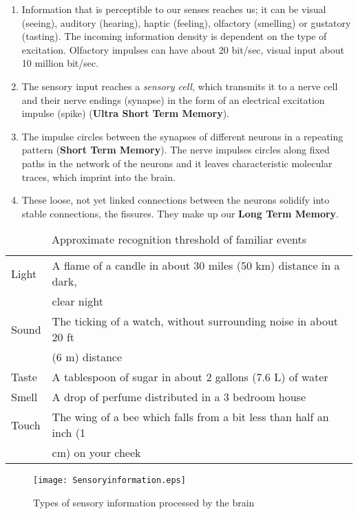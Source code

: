 \documentclass[../main.tex]{subfiles}
\begin{document}
\begin{enumerate}
\item Information that is {perceptible to our senses} reaches us; it can be visual (seeing), auditory (hearing), haptic (feeling), olfactory (smelling) or gustatory (tasting).
  The incoming {information density} is dependent on the type of excitation. Olfactory impulses can have about 20 bit/sec, visual input about 10 million bit/sec.
\item The sensory input reaches a \emph{sensory cell}, which transmits it to a {nerve cell} and their nerve endings (synapse) in the form of an electrical excitation impulse (spike) (\textbf{Ultra Short Term Memory}).
\item The impulse {circles} between the synapses of different neurons in a {repeating pattern} (\textbf{Short Term Memory}). The nerve impulses circles along fixed paths in the network of the neurons and it leaves {characteristic molecular traces}, which imprint into the brain.
\item These loose, not yet linked connections between the neurons solidify into {stable connections}, the {fissures}. They make up our  \textbf{Long Term Memory}.
\end{enumerate}

\begin{table}[htb]
  \centering
  \begin{tabular}{ll}
    Light & A flame of a candle in about 30 miles (50 km) distance in a dark, \\
    & clear night \\
    Sound & The ticking of a watch, without surrounding noise in about 20 ft \\
    & (6 m) distance \\
    Taste & A tablespoon of sugar in about 2 gallons (7.6 L) of water \\
    Smell & A drop of perfume distributed in a 3 bedroom house \\
    Touch & The wing of a bee which falls from a bit less than half an inch (1 \\
    & cm) on your cheek
  \end{tabular}
  \caption{Approximate recognition threshold of familiar events}
\end{table}

\begin{figure}[htb]
  \centering
  \texttt{[image: Sensoryinformation.eps]}
  \caption{Types of sensory information processed by the brain}
\end{figure}
\newpage
\end{document}
